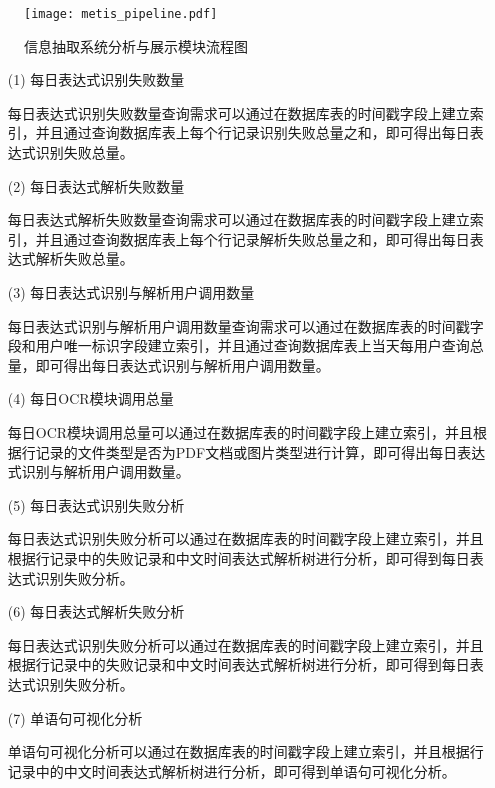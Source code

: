 \begin{figure}[h]
  \centering
  \texttt{[image: metis\_pipeline.pdf]}
  \caption{信息抽取系统分析与展示模块流程图}
  \label{fig:metis_pipeline}
\end{figure}

\begin{enumerate}
  \item[(1)] 每日表达式识别失败数量

        每日表达式识别失败数量查询需求可以通过在数据库表的时间戳字段上建立索引，并且通过查询数据库表上每个行记录识别失败总量之和，即可得出每日表达式识别失败总量。

  \item[(2)] 每日表达式解析失败数量

        每日表达式解析失败数量查询需求可以通过在数据库表的时间戳字段上建立索引，并且通过查询数据库表上每个行记录解析失败总量之和，即可得出每日表达式解析失败总量。

  \item[(3)] 每日表达式识别与解析用户调用数量

        每日表达式识别与解析用户调用数量查询需求可以通过在数据库表的时间戳字段和用户唯一标识字段建立索引，并且通过查询数据库表上当天每用户查询总量，即可得出每日表达式识别与解析用户调用数量。

  \item[(4)] 每日OCR模块调用总量

        每日OCR模块调用总量可以通过在数据库表的时间戳字段上建立索引，并且根据行记录的文件类型是否为PDF文档或图片类型进行计算，即可得出每日表达式识别与解析用户调用数量。

  \item[(5)] 每日表达式识别失败分析

        每日表达式识别失败分析可以通过在数据库表的时间戳字段上建立索引，并且根据行记录中的失败记录和中文时间表达式解析树进行分析，即可得到每日表达式识别失败分析。

  \item[(6)] 每日表达式解析失败分析

        每日表达式识别失败分析可以通过在数据库表的时间戳字段上建立索引，并且根据行记录中的失败记录和中文时间表达式解析树进行分析，即可得到每日表达式识别失败分析。

  \item[(7)] 单语句可视化分析

        单语句可视化分析可以通过在数据库表的时间戳字段上建立索引，并且根据行记录中的中文时间表达式解析树进行分析，即可得到单语句可视化分析。
\end{enumerate}

